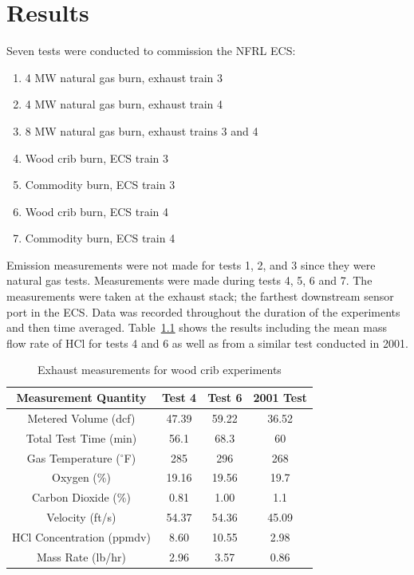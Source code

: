 \documentclass[12pt,oneside]{book}
\begin{document}
\chapter{Results}
Seven tests were conducted to commission the NFRL ECS:
\begin{enumerate}
\item 4 MW natural gas burn, exhaust train 3
\item 4 MW natural gas burn, exhaust train 4
\item 8 MW natural gas burn, exhaust trains 3 and 4
\item Wood crib burn, ECS train 3
\item Commodity burn, ECS train 3
\item Wood crib burn, ECS train 4
\item Commodity burn, ECS train 4
\end{enumerate}
Emission measurements were not made for tests 1, 2, and 3 since they were natural gas tests. Measurements were made during tests 4, 5, 6 and 7. The measurements were taken at the exhaust stack; the farthest downstream sensor port in the ECS.  Data was recorded throughout the duration of the experiments and then time averaged. Table~\ref{tab:hcl_data} shows the results including the mean mass flow rate of HCl for tests 4 and 6 as well as from a similar test conducted in 2001.

\begin{table}[!ht]
\centering
\caption{Exhaust measurements for wood crib experiments}
\label{tab:hcl_data}
\begin{tabular}{cccc}
\toprule[1.25pt]
Measurement Quantity & Test 4 & Test 6 & 2001 Test  \\
\midrule
Metered Volume (dcf)           &  47.39  &  59.22  &  36.52  \\
Total Test Time (min)          &  56.1   &  68.3   &  60     \\
Gas Temperature ($^{\circ}$F)  &  285    &  296    &  268    \\
Oxygen (\%)                    &  19.16  &  19.56  &  19.7   \\
Carbon Dioxide (\%)            &  0.81   &  1.00   &  1.1    \\
Velocity (ft/s)                &  54.37  &  54.36  &  45.09  \\
HCl Concentration (ppmdv)      &  8.60   &  10.55  &  2.98   \\
Mass Rate (lb/hr)              &  2.96   &  3.57   &  0.86   \\
\bottomrule[1.25pt]
\end{tabular}\par
\end{table}
\end{document}
